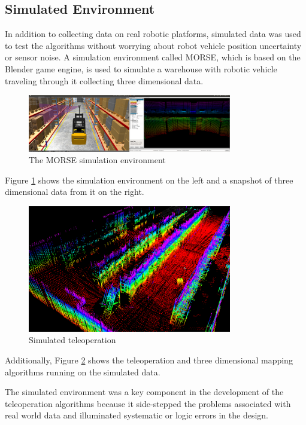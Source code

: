 \documentclass[journal]{IEEEtran}
\begin{document}
  \subsection{Simulated Environment}
  In addition to collecting data on real robotic platforms, simulated data was
  used to test the algorithms without worrying about robot vehicle position
  uncertainty or sensor noise. A simulation environment called MORSE, which is
  based on the Blender game engine, is used to simulate a warehouse with
  robotic vehicle traveling through it collecting three dimensional data.
  
  \begin{figure}[here]
    \centering
    \includegraphics[width=3.5in,keepaspectratio]{forklift.png}
    \caption{The MORSE simulation environment}
    \label{fig:forklift}
  \end{figure}
  
  Figure \ref{fig:forklift} shows the simulation environment on the left and a
  snapshot of three dimensional data from it on the right.
  
  \begin{figure}[here]
    \centering
    \includegraphics[width=3.5in,keepaspectratio]{simoctree.png}
    \caption{Simulated teleoperation}
    \label{fig:simoctree}
  \end{figure}
  
  Additionally, Figure \ref{fig:simoctree} shows the teleoperation and three
  dimensional mapping algorithms running on the simulated data.
  
  The simulated environment was a key component in the development of the
  teleoperation algorithms because it side-stepped the problems associated
  with real world data and illuminated systematic or logic errors in the
  design.
  
\end{document}
